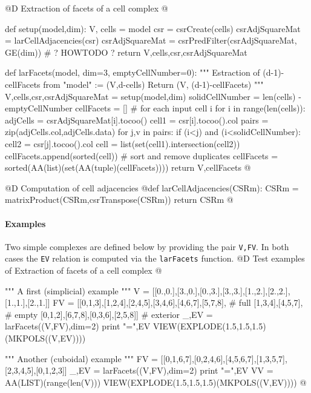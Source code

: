 \documentclass[11pt,oneside]{article}    %
\begin{document}
@D Extraction of facets of a cell complex
@{def setup(model,dim):
    V, cells = model
    csr = csrCreate(cells)
    csrAdjSquareMat = larCellAdjacencies(csr)
    csrAdjSquareMat = csrPredFilter(csrAdjSquareMat, GE(dim)) # ? HOWTODO ?
    return V,cells,csr,csrAdjSquareMat

def larFacets(model, dim=3, emptyCellNumber=0):
    """ Estraction of (d-1)-cellFacets from "model" := (V,d-cells)
        Return (V, (d-1)-cellFacets)
        """
    V,cells,csr,csrAdjSquareMat = setup(model,dim)
    solidCellNumber = len(cells) - emptyCellNumber
    cellFacets = []
    # for each input cell i
    for i in range(len(cells)):
        adjCells = csrAdjSquareMat[i].tocoo()
        cell1 = csr[i].tocoo().col
        pairs = zip(adjCells.col,adjCells.data)
        for j,v in pairs:
            if (i<j) and (i<solidCellNumber):
                cell2 = csr[j].tocoo().col
                cell = list(set(cell1).intersection(cell2))
                cellFacets.append(sorted(cell))
    # sort and remove duplicates
    cellFacets = sorted(AA(list)(set(AA(tuple)(cellFacets))))
    return V,cellFacets
@}



@D Computation of cell adjacencies
@{def larCellAdjacencies(CSRm):
    CSRm = matrixProduct(CSRm,csrTranspose(CSRm))
    return CSRm
@}

\paragraph{Examples}
Two simple complexes are defined below by providing the pair \texttt{V,FV}.
In both cases the \texttt{EV} relation is computed via the \texttt{larFacets} function.
@D Test examples of Extraction of facets of a cell complex
@{""" A first (simplicial) example """
V = [[0.,0.],[3.,0.],[0.,3.],[3.,3.],[1.,2.],[2.,2.],[1.,1.],[2.,1.]]
FV = [[0,1,3],[1,2,4],[2,4,5],[3,4,6],[4,6,7],[5,7,8], # full
    [1,3,4],[4,5,7], # empty
    [0,1,2],[6,7,8],[0,3,6],[2,5,8]] # exterior        
_,EV = larFacets((V,FV),dim=2)
print "\nEV =",EV
VIEW(EXPLODE(1.5,1.5,1.5)(MKPOLS((V,EV))))

""" Another (cuboidal) example """
FV = [[0,1,6,7],[0,2,4,6],[4,5,6,7],[1,3,5,7],[2,3,4,5],[0,1,2,3]]
_,EV = larFacets((V,FV),dim=2)
print "\nEV =",EV
VV = AA(LIST)(range(len(V)))
VIEW(EXPLODE(1.5,1.5,1.5)(MKPOLS((V,EV))))
@}
\end{document}
